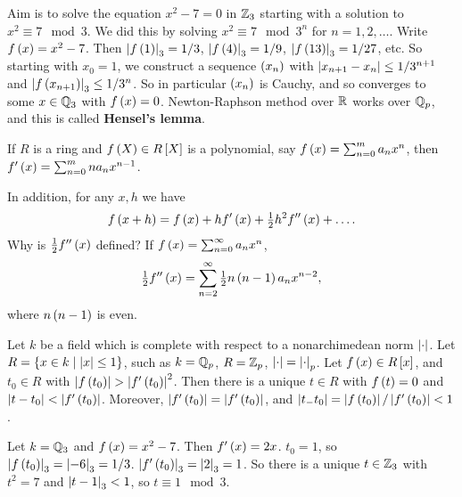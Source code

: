 Aim is to solve the equation $ x^2 - 7 = 0 $ in $ \mathbb{Z}_3 $ starting with a solution to $ x^2 \equiv 7 \mod 3 $. We did this by solving $ x^2 \equiv 7 \mod 3^n $ for $ n = 1, 2, \dots $. Write $ f\left( x \right) = x^2 - 7 $. Then $ \left\lvert f\left( 1 \right) \right\rvert_3 = 1 / 3 $, $ \left\lvert f\left( 4 \right) \right\rvert_3 = 1 / 9 $, $ \left\lvert f\left( 13 \right) \right\rvert_3 = 1 / 27 $, etc. So starting with $ x_0 = 1 $, we construct a sequence $ \left( x_n \right) $ with $ \left\lvert x_{n + 1} - x_n \right\rvert \le 1 / 3^{n + 1} $ and $ \left\lvert f\left( x_{n + 1} \right) \right\rvert_3 \le 1 / 3^n $. So in particular $ \left( x_n \right) $ is Cauchy, and so converges to some $ x \in \mathbb{Q}_3 $ with $ f\left( x \right) = 0 $. Newton-Raphson method over $ \mathbb{R} $ works over $ \mathbb{Q}_p $, and this is called \textbf{Hensel's lemma}.

\begin{definition}
If $ R $ is a ring and $ f\left( X \right) \in R\left[ X \right] $ is a polynomial, say $ f\left( x \right) = \sum_{n = 0}^m a_nx^n $, then $ f'\left( x \right) = \sum_{n = 0}^m na_nx^{n - 1} $.
\end{definition}

In addition, for any $ x, h $ we have
$$ f\left( x + h \right) = f\left( x \right) + hf'\left( x \right) + \tfrac{1}{2}h^2f''\left( x \right) + \dots. $$
Why is $ \tfrac{1}{2}f''\left( x \right) $ defined? If $ f\left( x \right) = \sum_{n = 0}^\infty a_nx^n $,
$$ \tfrac{1}{2}f''\left( x \right) = \sum_{n = 2}^\infty \tfrac{1}{2}n\left( n - 1 \right)a_nx^{n - 2}, $$
where $ n\left( n - 1 \right) $ is even.

\begin{theorem}
Let $ k $ be a field which is complete with respect to a nonarchimedean norm $ \left\lvert \cdot \right\rvert $. Let $ R = \left\{ x \in k \mid \left\lvert x \right\rvert \le 1 \right\} $, such as $ k = \mathbb{Q}_p $, $ R = \mathbb{Z}_p $, $ \left\lvert \cdot \right\rvert = \left\lvert \cdot \right\rvert_p $. Let $ f\left( x \right) \in R\left[ x \right] $, and $ t_0 \in R $ with $ \left\lvert f\left( t_0 \right) \right\rvert > \left\lvert f'\left( t_0 \right) \right\rvert^2 $. Then there is a unique $ t \in R $ with $ f\left( t \right) = 0 $ and $ \left\lvert t - t_0 \right\rvert < \left\lvert f'\left( t_0 \right) \right\rvert $. Moreover, $ \left\lvert f'\left( t_0 \right) \right\rvert = \left\lvert f'\left( t_0 \right) \right\rvert $, and $ \left\lvert t_- t_0 \right\rvert = \left\lvert f\left( t_0 \right) \right\rvert / \left\lvert f'\left( t_0 \right) \right\rvert < 1 $.
\end{theorem}

\begin{example*}
Let $ k = \mathbb{Q}_3 $ and $ f\left( x \right) = x^2 - 7 $. Then $ f'\left( x \right) = 2x $. $ t_0 = 1 $, so $ \left\lvert f\left( t_0 \right) \right\rvert_3 = \left\lvert -6 \right\rvert_3 = 1/ 3 $. $ \left\lvert f'\left( t_0 \right) \right\rvert_3 = \left\lvert 2 \right\rvert_3 = 1 $. So there is a unique $ t \in \mathbb{Z}_3 $ with $ t^2 = 7 $ and $ \left\lvert t - 1 \right\rvert_3 < 1 $, so $ t \equiv 1 \mod 3 $.
\end{example*}

